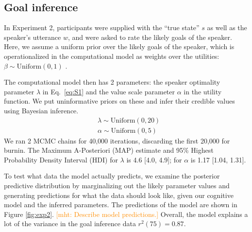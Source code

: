\documentclass[10pt,letterpaper]{article}
\newcommand{\mht}[1]{\textcolor{DarkOrange}{[mht: #1]}}
\begin{document}
\subsection{Goal inference}

In Experiment 2, participants were supplied with the ``true state'' $s$ as well as the speaker's utterance $w$, and were asked to rate the likely goals of the speaker. 
Here, we assume a uniform prior over the likely goals of the speaker, which is operationalized in the computational model as weights over the utilities: $\beta \sim \text{Uniform}(0,1)$ .


The computational model then has 2 parameters: the speaker optimality parameter $\lambda$ in Eq.~\ref{eq:S1} and the value scale parameter $\alpha$ in the utility function. 
We put uninformative priors on these and infer their credible values using Bayesian inference.
\begin{eqnarray*}
& \lambda \sim \text{Uniform}(0,20)\\
& \alpha \sim \text{Uniform}(0, 5)
\end{eqnarray*}
We ran 2 MCMC chains for 40,000 iterations, discarding the first 20,000 for burnin.
The Maximum A-Posteriori (MAP) estimate and 95\% Highest Probability Density Interval (HDI) for $\lambda$ is 4.6 [4.0, 4.9]; for $\alpha$ is 1.17 [1.04, 1.31].%




To test what data the model actually predicts, we examine the posterior predictive distribution by marginalizing out the likely parameter values and generating predictions for what the data should look like, given our cognitive model and the inferred parameters.
The predictions of the model are shown in Figure \ref{fig:exp2}.
\mht{Describe model predictions.}
Overall, the model explains a lot of the variance in the goal inference data $r^2(75) = 0.87$.
\end{document}

